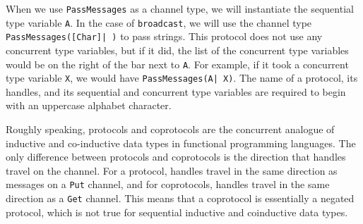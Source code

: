\documentclass[11pt]{article}
\begin{document}
When we use \lstinline$PassMessages$ as a channel type, we will instantiate the sequential type variable \lstinline$A$.
In the case of  \lstinline$broadcast$, we will use the channel type \lstinline$PassMessages([Char]| )$ to pass strings.
%
This protocol does not use any concurrent type variables, but if it did, the list of the concurrent type variables would be on the right of the bar next to \lstinline$A$.
For example, if it took a concurrent type variable \lstinline$X$, we would have \lstinline$PassMessages(A| X)$.
%
The name of a protocol, its handles, and its sequential and concurrent type variables are required to begin with an uppercase alphabet character. 

Roughly speaking, protocols and coprotocols are the concurrent analogue of inductive and co-inductive data types in functional programming languages. 
The only difference between protocols and coprotocols is the direction that handles travel on the channel.
For a protocol, handles travel in the same direction as messages on a \lstinline$Put$ channel, and for coprotocols, handles travel in the same direction as a \lstinline$Get$ channel.
This means that a coprotocol is essentially a negated protocol, which is not true for sequential inductive and coinductive data types.
\end{document}
